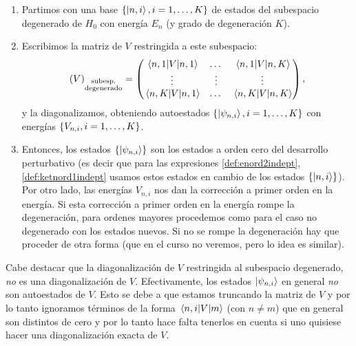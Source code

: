 \documentclass[10pt, a4paper]{article}
\numberwithin{equation}{subsection}
\begin{document}
\begin{enumerate}
  \item Partimos con una base $\set{\ket{n,i}, i=1,\dots,K}$ de estados del
    subespacio degenerado de $H_0$ con energía $E_n$ (y grado de degeneración
    $K$).
  \item Escribimos la matriz de $V$ restringida a este subespacio:
    \begin{equation}
      \left(V\right)_{\substack{\text{subesp.}\\\text{degenerado}}} =
      \begin{pmatrix}
        \matrixel{n,1}{V}{n,1} & \dots & \matrixel{n,1}{V}{n,K} \\
        \vdots & \vdots & \vdots \\
        \matrixel{n,K}{V}{n,1} & \dots & \matrixel{n,K}{V}{n,K}
      \end{pmatrix},
    \end{equation}
    y la diagonalizamos, obteniendo autoestados $\set{\ket{\psi_{n,i}},
    i=1,\dots,K}$ con energías $\set{V_{n,i}, i=1,\dots,K}$.
  \item Entonces, los estados $\set{\ket{\psi_{n,i}}}$ son los estados a orden
    cero del desarrollo perturbativo (es decir que para las expresiones
    \eqref{def:enord2indept}, \eqref{def:ketnord1indept} usamos estos estados
    en cambio de los estados $\set{\ket{n,i}}$). Por otro lado, las energías
    $V_{n,i}$ nos dan la corrección a primer orden en la energía.
    Si esta corrección a primer orden en la energía rompe la degeneración, para
    ordenes mayores procedemos como para el caso no degenerado con los estados
    nuevos. Si no se rompe la degeneración hay que proceder de otra forma (que
    en el curso no veremos, pero lo idea es similar).
\end{enumerate}
Cabe destacar que la diagonalización de $V$ restringida al subespacio
degenerado, \emph{no} es una diagonalización de $V$. Efectivamente, los estados
$\ket{\psi_{n,i}}$ en general \emph{no} son autoestados de $V$. Esto se debe a
que estamos truncando la matriz de $V$ y por lo tanto ignoramos términos de la
forma $\matrixel{n,i}{V}{m}$ (con $n \neq m$) que en general son distintos de
cero y por lo tanto hace falta tenerlos en cuenta si uno quisiese hacer una
diagonalización exacta de $V$.

\end{document}
